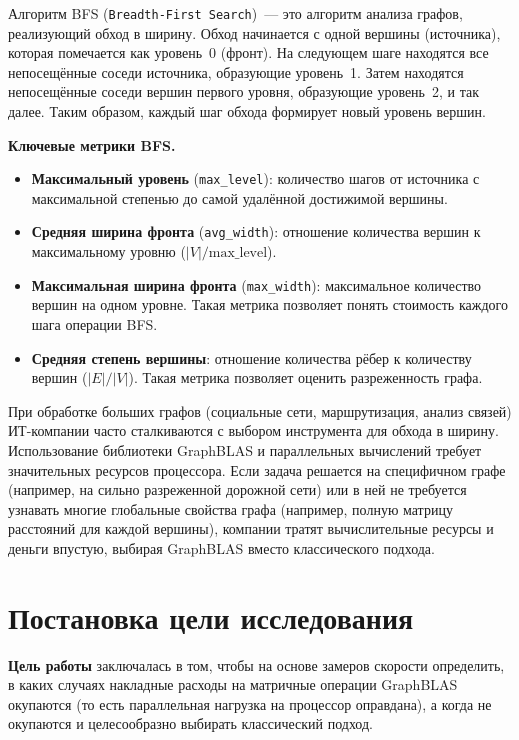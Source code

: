 \documentclass[a4paper]{article}
\begin{document}
Алгоритм BFS (\texttt{Breadth-First Search})~--- это алгоритм анализа графов, реализующий обход в ширину. Обход начинается с одной вершины (источника), которая помечается как уровень~0 (фронт). На следующем шаге находятся все непосещённые соседи источника, образующие уровень~1. Затем находятся непосещённые соседи вершин первого уровня, образующие уровень~2, и так далее. Таким образом, каждый шаг обхода формирует новый уровень вершин.

\textbf{Ключевые метрики BFS.}

\begin{itemize}
    \item \textbf{Максимальный уровень} (\texttt{max\_level}): количество шагов от источника с максимальной степенью до самой удалённой достижимой вершины.
    \item \textbf{Средняя ширина фронта} (\texttt{avg\_width}): отношение количества вершин к максимальному уровню ($|V| / \text{max\_level}$).
    \item \textbf{Максимальная ширина фронта} (\texttt{max\_width}): максимальное количество вершин на одном уровне. Такая метрика позволяет понять стоимость каждого шага операции BFS.
    \item \textbf{Средняя степень вершины}: отношение количества рёбер к количеству вершин ($|E| / |V|$). Такая метрика позволяет оценить разреженность графа.
\end{itemize}

При обработке больших графов (социальные сети, маршрутизация, анализ связей) ИТ-компании часто сталкиваются с выбором инструмента для обхода в ширину. Использование библиотеки GraphBLAS и параллельных вычислений требует значительных ресурсов процессора. Если задача решается на специфичном графе (например, на сильно разреженной дорожной сети) или в ней не требуется узнавать многие глобальные свойства графа (например, полную матрицу расстояний для каждой вершины), компании тратят вычислительные ресурсы и деньги впустую, выбирая GraphBLAS вместо классического подхода.

\section{Постановка цели исследования}

\textbf{Цель работы} заключалась в том, чтобы на основе замеров скорости определить, в каких случаях накладные расходы на матричные операции GraphBLAS окупаются (то есть параллельная нагрузка на процессор оправдана), а когда не окупаются и целесообразно выбирать классический подход.
\end{document}
